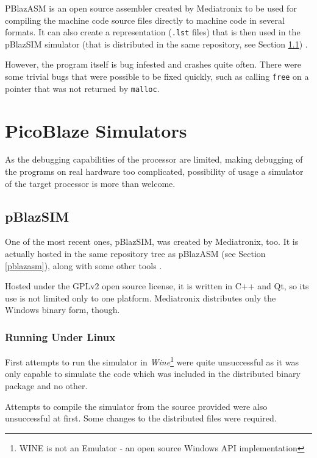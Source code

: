         PBlazASM is an open source assembler created by Mediatronix to be used for compiling the machine code source files directly to machine code in several formats. It can also create a representation (\texttt{.lst} files) that is then used in the pBlazSIM simulator (that is distributed in the same repository, see Section \ref{pblazsim}) \cite{PblazAsm}.

        However, the program itself is bug infested and crashes quite often. There were some trivial bugs that were possible to be fixed quickly, such as calling \texttt{free} on a pointer that was not returned by \texttt{malloc}.

    \section{PicoBlaze Simulators}

        As the debugging capabilities of the processor are limited, making debugging of the programs on real hardware too complicated, possibility of usage a simulator of the target processor is more than welcome.

        \subsection{pBlazSIM}\label{pblazsim}

        One of the most recent ones, pBlazSIM, was created by Mediatronix, too. It is actually hosted in the same repository tree as pBlazASM (see Section \ref{pblazasm}), along with some other tools \cite{PblazSim}. \cite{PblazAsmRepo}

        Hosted under the GPLv2 open source license, it is written in C++ and Qt, so its use is not limited only to one platform. Mediatronix distributes only the Windows binary form, though.

            \subsubsection{Running Under Linux}

            First attempts to run the simulator in \emph{Wine}\footnote{WINE is not an Emulator - an open source Windows API implementation} were quite unsuccessful as it was only capable to simulate the code which was included in the distributed binary package and no other.

            Attempts to compile the simulator from the source provided were also unsuccessful at first. Some changes to the distributed files were required.

